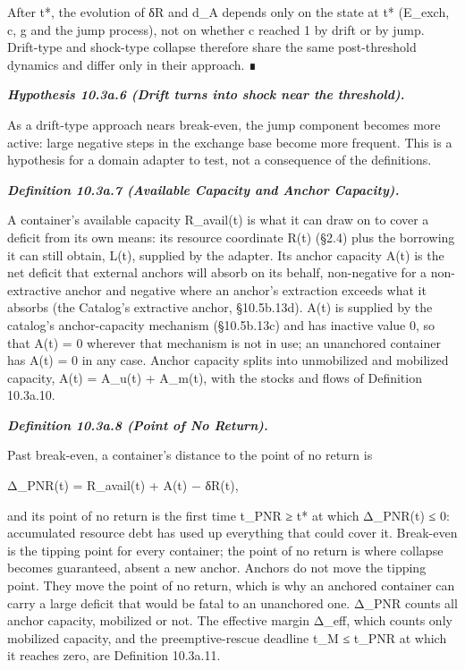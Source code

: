 \documentclass[
]{article}
\begin{document}
After t*, the evolution of δR and d\_A depends only on the state at t*
(E\_exch, c, g and the jump process), not on whether c reached 1 by
drift or by jump. Drift-type and shock-type collapse therefore share the
same post-threshold dynamics and differ only in their approach. ∎

\emph{\textbf{Hypothesis 10.3a.6 (Drift turns into shock near the
threshold).}}

As a drift-type approach nears break-even, the jump component becomes
more active: large negative steps in the exchange base become more
frequent. This is a hypothesis for a domain adapter to test, not a
consequence of the definitions.

\emph{\textbf{Definition 10.3a.7 (Available Capacity and Anchor
Capacity).}}

A container's available capacity R\_avail(t) is what it can draw on to
cover a deficit from its own means: its resource coordinate R(t) (§2.4)
plus the borrowing it can still obtain, L(t), supplied by the adapter.
Its anchor capacity A(t) is the net deficit that external anchors will
absorb on its behalf, non-negative for a non-extractive anchor and
negative where an anchor's extraction exceeds what it absorbs (the
Catalog's extractive anchor, §10.5b.13d). A(t) is supplied by the
catalog's anchor-capacity mechanism (§10.5b.13c) and has inactive value
0, so that A(t) = 0 wherever that mechanism is not in use; an unanchored
container has A(t) = 0 in any case. Anchor capacity splits into
unmobilized and mobilized capacity, A(t) = A\_u(t) + A\_m(t), with the
stocks and flows of Definition 10.3a.10.

\emph{\textbf{Definition 10.3a.8 (Point of No Return).}}

Past break-even, a container's distance to the point of no return is

Δ\_PNR(t) = R\_avail(t) + A(t) − δR(t),

and its point of no return is the first time t\_PNR ≥ t* at which
Δ\_PNR(t) ≤ 0: accumulated resource debt has used up everything that
could cover it. Break-even is the tipping point for every container; the
point of no return is where collapse becomes guaranteed, absent a new
anchor. Anchors do not move the tipping point. They move the point of no
return, which is why an anchored container can carry a large deficit
that would be fatal to an unanchored one. Δ\_PNR counts all anchor
capacity, mobilized or not. The effective margin Δ\_eff, which counts
only mobilized capacity, and the preemptive-rescue deadline t\_M ≤
t\_PNR at which it reaches zero, are Definition 10.3a.11.
\end{document}
